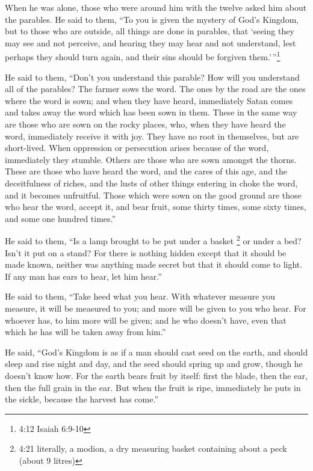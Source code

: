  When he was alone, those who were around him with the
twelve asked him about the parables.  He said to them, ``To
you is given the mystery of God's Kingdom, but to those who are outside,
all things are done in parables,  that `seeing they may see
and not perceive, and hearing they may hear and not understand, lest
perhaps they should turn again, and their sins should be forgiven
them.'\,''\footnote{4:12 Isaiah 6:9-10}

 He said to them, ``Don't you understand this parable? How
will you understand all of the parables?  The farmer sows
the word.  The ones by the road are the ones where the word
is sown; and when they have heard, immediately Satan comes and takes
away the word which has been sown in them.  These in the
same way are those who are sown on the rocky places, who, when they have
heard the word, immediately receive it with joy.  They have
no root in themselves, but are short-lived. When oppression or
persecution arises because of the word, immediately they stumble.
 Others are those who are sown amongst the thorns. These
are those who have heard the word,  and the cares of this
age, and the deceitfulness of riches, and the lusts of other things
entering in choke the word, and it becomes unfruitful. 
Those which were sown on the good ground are those who hear the word,
accept it, and bear fruit, some thirty times, some sixty times, and some
one hundred times.''

 He said to them, ``Is a lamp brought to be put under a
basket \footnote{4:21 literally, a modion, a dry measuring basket
  containing about a peck (about 9 litres)} or under a bed? Isn't it put
on a stand?  For there is nothing hidden except that it
should be made known, neither was anything made secret but that it
should come to light.  If any man has ears to hear, let him
hear.''

 He said to them, ``Take heed what you hear. With whatever
measure you measure, it will be measured to you; and more will be given
to you who hear.  For whoever has, to him more will be
given; and he who doesn't have, even that which he has will be taken
away from him.''

 He said, ``God's Kingdom is as if a man should cast seed
on the earth,  and should sleep and rise night and day, and
the seed should spring up and grow, though he doesn't know how.
 For the earth bears fruit by itself: first the blade, then
the ear, then the full grain in the ear.  But when the
fruit is ripe, immediately he puts in the sickle, because the harvest
has come.''

